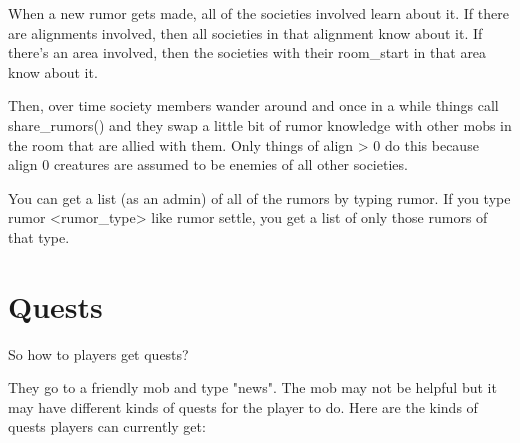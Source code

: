 When a new rumor gets made, all of the societies involved learn
about it. If there are alignments involved, then all societies in
that alignment know about it. If there's an area involved, then
the societies with their room\_start in that area know about it.

Then, over time society members wander around and once in a while
things call share\_rumors() and they swap a little bit of
rumor knowledge with other mobs in the room that are allied
with them. Only things of align > 0 do this because align 0
creatures are assumed to be enemies of all other societies.

You can get a list (as an admin) of all of the rumors by typing
rumor. If you type rumor <rumor\_type> like rumor settle, you get
a list of only those rumors of that type.

\section{Quests}

So how to players get quests?

They go to a friendly mob and type "news". The mob may not be helpful
but it may have different kinds of quests for the player to do. 
Here are the kinds of quests players can currently get:

